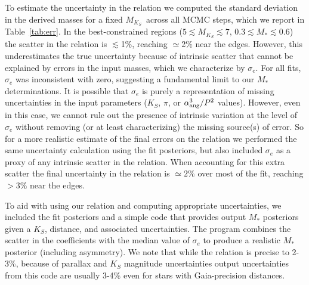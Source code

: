 \documentclass[twocolumn]{aastex62}
\newcommand{\mks}{$M_{K_S}$}
\begin{document}
To estimate the uncertainty in the relation we computed the standard deviation in the derived masses for a fixed \mks\ across all MCMC steps, which we report in Table~\ref{tab:err}. In the best-constrained regions ($5\lesssim$\mks$\lesssim7$, $0.3\lesssim M_*\lesssim0.6$) the scatter in the relation is $\lesssim$1\%, reaching $\simeq$2\% near the edges. However, this underestimates the true uncertainty because of intrinsic scatter that cannot be explained by errors in the input masses, which we characterize by $\sigma_e$. For all fits, $\sigma_e$ was inconsistent with zero, suggesting a fundamental limit to our $M_*$ determinations. It is possible that $\sigma_e$ is purely a representation of missing uncertainties in the input parameters ($K_S$, $\pi$, or $\alpha_{\rm{ang}}^3/P^2$ values). However, even in this case, we cannot rule out the presence of intrinsic variation at the level of $\sigma_e$ without removing (or at least characterizing) the missing source(s) of error. So for a more realistic estimate of the final errors on the relation we performed the same uncertainty calculation using the fit posteriors, but also included $\sigma_e$ as a proxy of any intrinsic scatter in the relation. When accounting for this extra scatter the final uncertainty in the relation is $\simeq2\%$ over most of the fit, reaching $>3\%$ near the edges. 

To aid with using our relation and computing appropriate uncertainties, we included the fit posteriors and a simple code that provides output $M_*$ posteriors given a $K_S$, distance, and associated uncertainties. The program combines the scatter in the coefficients with the median value of $\sigma_e$ to produce a realistic $M_*$ posterior (including asymmetry). We note that while the relation is precise to 2-3\%, because of parallax and $K_S$ magnitude uncertainties output uncertainties from this code are usually 3-4\% even for stars with Gaia-precision distances. 
\end{document}
